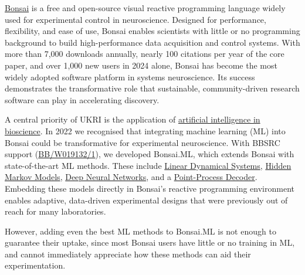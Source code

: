 
\href{https://bonsai-rx.org/}{Bonsai} is a free and open-source visual reactive
programming language widely used for experimental control in neuroscience.
Designed for performance, flexibility, and ease of use, Bonsai enables
scientists with little or no programming background to build high-performance
data acquisition and control systems. With more than 7,000 downloads annually,
nearly 100 citations per year of the core paper, and over 1,000 new users in
2024 alone, Bonsai has become the most widely adopted software platform in
systems neuroscience. Its success demonstrates the transformative role that
sustainable, community-driven research software can play in accelerating
discovery.


A central priority of UKRI is the application of
\href{https://www.ukri.org/what-we-do/browse-our-areas-of-investment-and-support/artificial-intelligence-in-bioscience/}{artificial
intelligence in bioscience}. In 2022 we recognised that integrating machine
learning (ML) into Bonsai could be transformative for experimental
neuroscience. With BBSRC support
(\href{https://gow.bbsrc.ukri.org/grants/AwardDetails.aspx?FundingReference=BB\%2FW019132\%2F1}{BB/W019132/1}),
we developed Bonsai.ML, which extends Bonsai with state-of-the-art ML methods.
These include
\href{https://bonsai-rx.org/machinelearning/examples/examples/LinearDynamicalSystems/README.html}{Linear
Dynamical Systems},
\href{https://bonsai-rx.org/machinelearning/examples/examples/HiddenMarkovModels/README.html}{Hidden
Markov Models},
\href{https://bonsai-rx.org/machinelearning/examples/examples/Torch/NeuralNetsTrainedOnline/README.html}{Deep
Neural Networks}, and a
\href{https://bonsai-rx.org/machinelearning/examples/examples/PointProcessDecoder/DecodePositionFromHippocampusSortedUnits/README.html}{Point-Process
Decoder}. Embedding these models directly in Bonsai's reactive programming
environment enables adaptive, data-driven experimental designs that were
previously out of reach for many laboratories.


However, adding even the best ML methods to Bonsai.ML is not enough to guarantee
their uptake, since most Bonsai users have little or no training in ML, and
cannot immediately appreciate how these methods can aid their experimentation.
%
%

